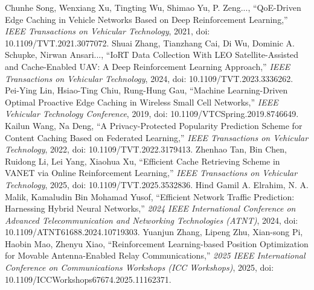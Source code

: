 Chunhe Song, Wenxiang Xu, Tingting Wu, Shimao Yu, P. Zeng..., ``QoE-Driven Edge Caching in Vehicle Networks Based on Deep Reinforcement Learning,'' \textit{IEEE Transactions on Vehicular Technology}, 2021, doi: 10.1109/TVT.2021.3077072.
Shuai Zhang, Tianzhang Cai, Di Wu, Dominic A. Schupke, Nirwan Ansari..., ``IoRT Data Collection With LEO Satellite-Assisted and Cache-Enabled UAV: A Deep Reinforcement Learning Approach,'' \textit{IEEE Transactions on Vehicular Technology}, 2024, doi: 10.1109/TVT.2023.3336262.
Pei-Ying Lin, Hsiao-Ting Chiu, Rung-Hung Gau, ``Machine Learning-Driven Optimal Proactive Edge Caching in Wireless Small Cell Networks,'' \textit{IEEE Vehicular Technology Conference}, 2019, doi: 10.1109/VTCSpring.2019.8746649.
Kailun Wang, Na Deng, ``A Privacy-Protected Popularity Prediction Scheme for Content Caching Based on Federated Learning,'' \textit{IEEE Transactions on Vehicular Technology}, 2022, doi: 10.1109/TVT.2022.3179413.
Zhenhao Tan, Bin Chen, Ruidong Li, Lei Yang, Xiaohua Xu, ``Efficient Cache Retrieving Scheme in VANET via Online Reinforcement Learning,'' \textit{IEEE Transactions on Vehicular Technology}, 2025, doi: 10.1109/TVT.2025.3532836.
Hind Gamil A. Elrahim, N. A. Malik, Kamaludin Bin Mohamad Yusof, ``Efficient Network Traffic Prediction: Harnessing Hybrid Neural Networks,'' \textit{2024 IEEE International Conference on Advanced Telecommunication and Networking Technologies (ATNT)}, 2024, doi: 10.1109/ATNT61688.2024.10719303.
Yuanjun Zhang, Lipeng Zhu, Xian-song Pi, Haobin Mao, Zhenyu Xiao, ``Reinforcement Learning-based Position Optimization for Movable Antenna-Enabled Relay Communications,'' \textit{2025 IEEE International Conference on Communications Workshops (ICC Workshops)}, 2025, doi: 10.1109/ICCWorkshops67674.2025.11162371.

